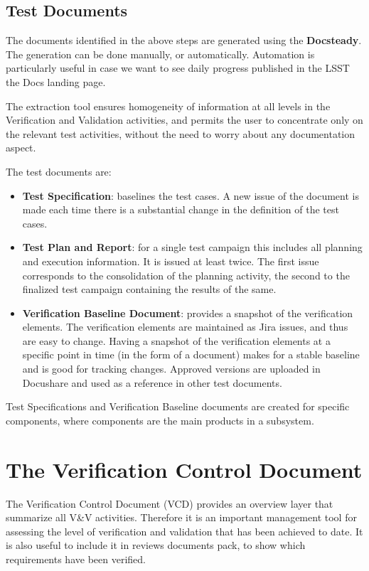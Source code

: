 \subsection{Test Documents}

The documents identified in the above steps are generated using the \textbf{Docsteady}.
The generation can be done manually, or automatically.
Automation is particularly useful in case we want to see daily progress published in the LSST the Docs landing page.

The extraction tool ensures homogeneity of information at all levels in the Verification and Validation activities,
and permits the user to concentrate only on the relevant test activities, without the need to worry about any documentation aspect.

The test documents are:

\begin{itemize}
\item \textbf{Test Specification}:  baselines the test cases.
A new issue of the document is made each time there is a substantial change in the definition of the test cases.
\item \textbf{Test Plan and Report}:  for a single test campaign this includes all planning and execution information.
It  is issued at least twice. The first issue corresponds to the consolidation of the planning activity,
the second to the finalized test campaign containing the results of the same.
\item \textbf{Verification Baseline Document}: provides a snapshot of the verification elements.
The verification elements are  maintained as Jira issues, and  thus are easy to change.
Having a snapshot of the verification elements at a specific point in time  (in the form of a document) makes
for a stable baseline and is good for tracking changes.
Approved versions are uploaded in Docushare and used as a reference in other test documents.
\end{itemize}

Test Specifications and Verification Baseline documents are created for specific components, where components are the main products in a subsystem.


\section{The Verification Control Document}

The Verification Control Document (VCD) provides an overview layer that summarize all V\&V activities.
Therefore it is an important management tool for assessing the level of verification and validation that has been achieved to date.
It is also useful to include it in reviews documents pack, to show which requirements have been verified.

